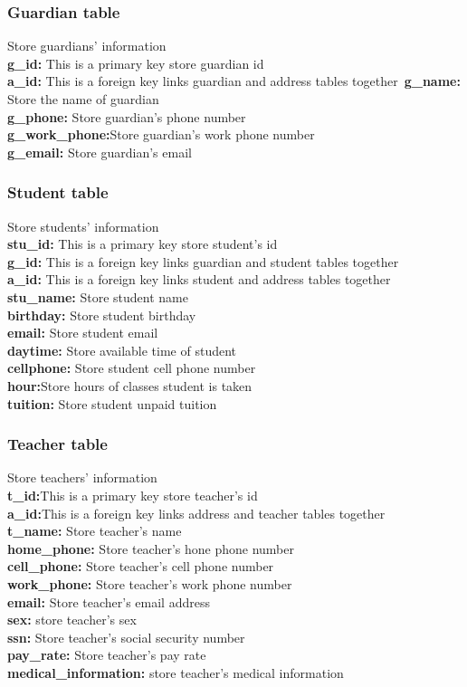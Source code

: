 \subsubsection{Guardian table}
Store guardians' information\\
\textbf{g\_id:} This is a primary key store guardian id\\
\textbf{a\_id:} This is a foreign key links guardian and address tables together\
\textbf{g\_name:} Store the name of guardian\\
\textbf{g\_phone:} Store guardian's phone number \\
\textbf{g\_work\_phone:}Store guardian's work phone number\\
\textbf{g\_email:} Store guardian's email

\subsubsection{Student table}
Store students' information\\
\textbf{stu\_id:} This is a primary key store student's id\\
\textbf{g\_id:} This is a foreign key links guardian and student tables together\\
\textbf{a\_id:} This is a foreign key links student and address tables together\\
\textbf{stu\_name:} Store student name\\
\textbf{birthday:} Store student birthday\\
\textbf{email:} Store student email\\
\textbf{daytime:} Store available time of student\\
\textbf{cellphone:} Store student cell phone number\\
\textbf{hour:}Store hours of classes student is taken\\
\textbf{tuition:} Store student unpaid tuition\\


\subsubsection{Teacher table}
Store teachers' information\\
\textbf{t\_id:}This is a primary key store teacher's id\\
\textbf{a\_id:}This is a foreign key links address and teacher tables together\\
\textbf{t\_name:} Store teacher's name\\
\textbf{home\_phone:} Store teacher's hone phone number\\
\textbf{cell\_phone:} Store teacher's cell phone number\\
\textbf{work\_phone:} Store teacher's work phone number\\
\textbf{email:} Store teacher's email address\\
\textbf{sex:} store teacher's sex\\
\textbf{ssn:} Store teacher's social security number\\
\textbf{pay\_rate:} Store teacher's pay rate\\
\textbf{medical\_information:} store teacher's medical information


